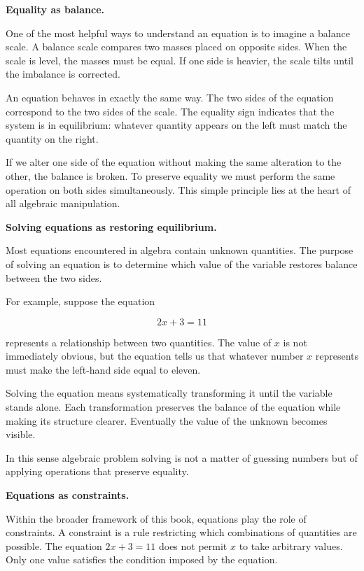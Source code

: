 \documentclass[11pt, openany]{book}
\theoremstyle{plain}
\theoremstyle{definition}
\theoremstyle{remark}
\begin{document}
\textbf{Equality as balance.}

One of the most helpful ways to understand an equation is to imagine a
balance scale. A balance scale compares two masses placed on opposite
sides. When the scale is level, the masses must be equal. If one side is
heavier, the scale tilts until the imbalance is corrected.

An equation behaves in exactly the same way. The two sides of the
equation correspond to the two sides of the scale. The equality sign
indicates that the system is in equilibrium: whatever quantity appears
on the left must match the quantity on the right.

If we alter one side of the equation without making the same alteration
to the other, the balance is broken. To preserve equality we must perform
the same operation on both sides simultaneously. This simple principle
lies at the heart of all algebraic manipulation.

\medskip

\textbf{Solving equations as restoring equilibrium.}

Most equations encountered in algebra contain unknown quantities. The
purpose of solving an equation is to determine which value of the
variable restores balance between the two sides.

For example, suppose the equation

\[
2x + 3 = 11
\]

represents a relationship between two quantities. The value of $x$ is not
immediately obvious, but the equation tells us that whatever number $x$
represents must make the left-hand side equal to eleven.

Solving the equation means systematically transforming it until the
variable stands alone. Each transformation preserves the balance of the
equation while making its structure clearer. Eventually the value of the
unknown becomes visible.

In this sense algebraic problem solving is not a matter of guessing
numbers but of applying operations that preserve equality.

\medskip

\textbf{Equations as constraints.}

Within the broader framework of this book, equations play the role of
constraints. A constraint is a rule restricting which combinations of
quantities are possible. The equation $2x+3=11$ does not permit $x$ to
take arbitrary values. Only one value satisfies the condition imposed by
the equation.
\end{document}
